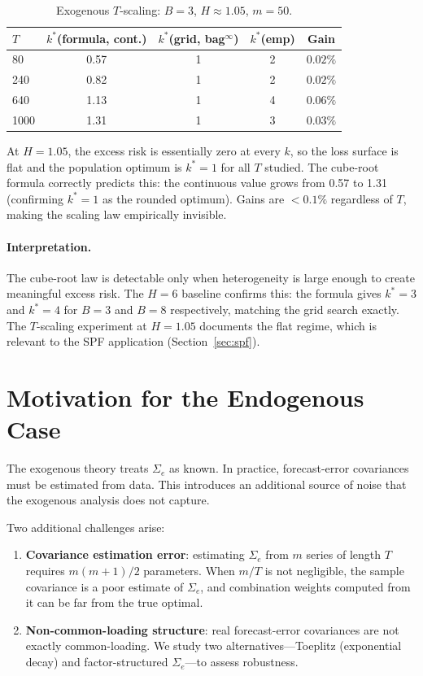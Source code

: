 \documentclass[12pt,a4paper]{article}
\theoremstyle{definition}
\begin{document}
\begin{table}[ht]
\centering
\caption{Exogenous $T$-scaling: $B=3$, $H\approx1.05$, $m=50$.}
\label{tab:exo_scaling}
\begin{tabular}{lcccc}
\toprule
$T$ & $k^*$(formula, cont.) & $k^*$(grid, bag$^\infty$) & $k^*$(emp) & Gain \\
\midrule
80   & 0.57 & 1 & 2 & $0.02\%$ \\
240  & 0.82 & 1 & 2 & $0.02\%$ \\
640  & 1.13 & 1 & 4 & $0.06\%$ \\
1000 & 1.31 & 1 & 3 & $0.03\%$ \\
\bottomrule
\end{tabular}
\end{table}

At $H=1.05$, the excess risk is essentially zero at every $k$, so the loss
surface is flat and the population optimum is $k^*=1$ for all $T$ studied.
The cube-root formula correctly predicts this: the continuous value grows
from 0.57 to 1.31 (confirming $k^*=1$ as the rounded optimum). Gains are
$<0.1\%$ regardless of $T$, making the scaling law empirically invisible.

\paragraph{Interpretation.}
The cube-root law is detectable only when heterogeneity is large enough to
create meaningful excess risk. The $H=6$ baseline confirms this: the formula
gives $k^*=3$ and $k^*=4$ for $B=3$ and $B=8$ respectively, matching the grid
search exactly. The $T$-scaling experiment at $H=1.05$ documents the flat
regime, which is relevant to the SPF application (Section~\ref{sec:spf}).

\section{Motivation for the Endogenous Case}
\label{sec:endo_motivation}

The exogenous theory treats $\Sigma_e$ as known. In practice, forecast-error
covariances must be estimated from data. This introduces an additional source
of noise that the exogenous analysis does not capture.

Two additional challenges arise:
\begin{enumerate}
\item \textbf{Covariance estimation error}: estimating $\Sigma_e$ from $m$
  series of length $T$ requires $m(m+1)/2$ parameters. When $m/T$ is not
  negligible, the sample covariance is a poor estimate of $\Sigma_e$, and
  combination weights computed from it can be far from the true optimal.
\item \textbf{Non-common-loading structure}: real forecast-error covariances
  are not exactly common-loading. We study two alternatives---Toeplitz
  (exponential decay) and factor-structured $\Sigma_e$---to assess
  robustness.
\end{enumerate}
\end{document}
